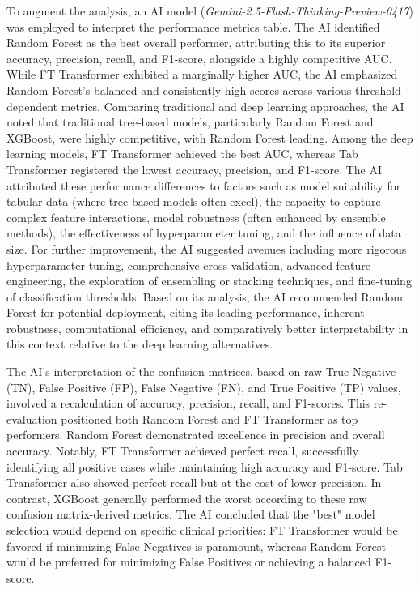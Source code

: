 To augment the analysis, an AI model (\textit{Gemini-2.5-Flash-Thinking-Preview-0417}) \parencite{Doshi_2025} was employed to interpret the performance metrics table. The AI identified Random Forest as the best overall performer, attributing this to its superior accuracy, precision, recall, and F1-score, alongside a highly competitive AUC. While FT Transformer exhibited a marginally higher AUC, the AI emphasized Random Forest's balanced and consistently high scores across various threshold-dependent metrics. Comparing traditional and deep learning approaches, the AI noted that traditional tree-based models, particularly Random Forest and XGBoost, were highly competitive, with Random Forest leading. Among the deep learning models, FT Transformer achieved the best AUC, whereas Tab Transformer registered the lowest accuracy, precision, and F1-score. The AI attributed these performance differences to factors such as model suitability for tabular data (where tree-based models often excel), the capacity to capture complex feature interactions, model robustness (often enhanced by ensemble methods), the effectiveness of hyperparameter tuning, and the influence of data size. For further improvement, the AI suggested avenues including more rigorous hyperparameter tuning, comprehensive cross-validation, advanced feature engineering, the exploration of ensembling or stacking techniques, and fine-tuning of classification thresholds. Based on its analysis, the AI recommended Random Forest for potential deployment, citing its leading performance, inherent robustness, computational efficiency, and comparatively better interpretability in this context relative to the deep learning alternatives.

The AI's interpretation of the confusion matrices, based on raw True Negative (TN), False Positive (FP), False Negative (FN), and True Positive (TP) values, involved a recalculation of accuracy, precision, recall, and F1-scores. This re-evaluation positioned both Random Forest and FT Transformer as top performers. Random Forest demonstrated excellence in precision and overall accuracy. Notably, FT Transformer achieved perfect recall, successfully identifying all positive cases while maintaining high accuracy and F1-score. Tab Transformer also showed perfect recall but at the cost of lower precision. In contrast, XGBoost generally performed the worst according to these raw confusion matrix-derived metrics. The AI concluded that the "best" model selection would depend on specific clinical priorities: FT Transformer would be favored if minimizing False Negatives is paramount, whereas Random Forest would be preferred for minimizing False Positives or achieving a balanced F1-score.

